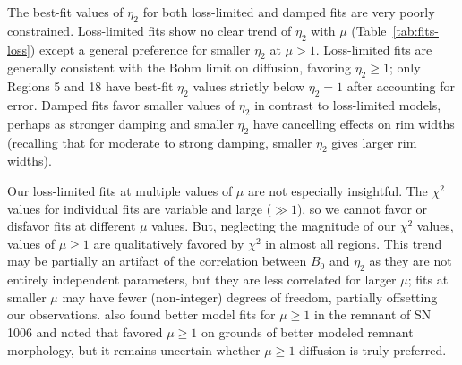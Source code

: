 \documentclass[iop, apj, numberedappendix]{emulateapj}
\newcommand*{\mt}{\mathrm}
\newcommand*{\unit}[1]{\;\mt{#1}}  %
\newcommand*{\Ecut}{E_{\mt{cut}}}
\newcommand*{\muG}{\unit{\mu G}}
\begin{document}

The best-fit values of $\eta_2$ for both loss-limited and damped fits are very
poorly constrained.  Loss-limited fits show no clear trend of $\eta_2$ with
$\mu$ (Table~\ref{tab:fits-loss}) except a general preference for smaller
$\eta_2$ at $\mu > 1$.  Loss-limited fits are generally consistent with the
Bohm limit on diffusion, favoring $\eta_2 \geq 1$; only Regions 5 and 18 have
best-fit $\eta_2$ values strictly below $\eta_2 = 1$ after accounting for
error.  Damped fits favor smaller values of $\eta_2$ in contrast to
loss-limited models, perhaps as stronger damping and smaller $\eta_2$ have
cancelling effects on rim widths (recalling that for moderate to strong
damping, smaller $\eta_2$ gives larger rim widths).

Our loss-limited fits at multiple values of $\mu$ are not especially
insightful.  The $\chi^2$ values for individual fits are variable and large
($\gg 1$), so we cannot favor or disfavor fits at different $\mu$ values.  But,
neglecting the magnitude of our $\chi^2$ values, values of $\mu \geq 1$ are
qualitatively favored by $\chi^2$ in almost all regions.  This trend may be
partially an artifact of the correlation between $B_0$ and $\eta_2$ as they are
not entirely independent parameters, but they are less correlated for larger
$\mu$; fits at smaller $\mu$ may have fewer (non-integer) degrees of freedom,
partially offsetting our observations.   also found
better model fits for $\mu \geq 1$ in the remnant of SN 1006 and noted that
\citet{reynolds2004} favored $\mu \geq 1$ on grounds of better modeled remnant
morphology, but it remains uncertain whether $\mu \geq 1$ diffusion is truly
preferred.
\end{document}
